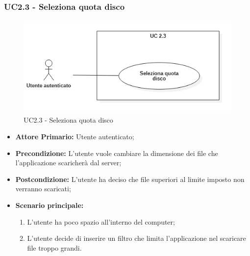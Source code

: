 \subsubsection{UC2.3 - Seleziona quota disco}
\begin{figure}[H]
    \centering
    \includegraphics[scale = 0.7]{components/img/UC2_3.png}
    \caption{UC2.3 - Seleziona quota disco}
\end{figure}
\begin{itemize}
\item \textbf{Attore Primario:} Utente autenticato;
\item \textbf{Precondizione:} L'utente vuole cambiare la dimensione dei file che l'applicazione scaricherà dal server;
\item \textbf{Postcondizione:} L'utente ha deciso che file superiori al limite imposto non verranno scaricati;
\item \textbf{Scenario principale:}
    \begin{enumerate}
    \item L'utente ha poco spazio all'interno del computer;
    \item L'utente decide di inserire un filtro che limita l'applicazione nel scaricare file troppo grandi.
    \end{enumerate}
\end{itemize}

